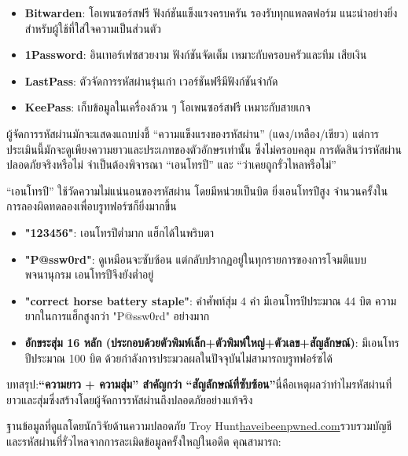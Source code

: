 
\begin{itemize}
  \item \textbf{Bitwarden}: โอเพนซอร์สฟรี ฟังก์ชันแข็งแรงครบครัน รองรับทุกแพลตฟอร์ม แนะนำอย่างยิ่งสำหรับผู้ใช้ที่ใส่ใจความเป็นส่วนตัว
  \item \textbf{1Password}: อินเทอร์เฟซสวยงาม ฟังก์ชันจัดเต็ม เหมาะกับครอบครัวและทีม เสียเงิน
  \item \textbf{LastPass}: ตัวจัดการรหัสผ่านรุ่นเก่า เวอร์ชันฟรีมีฟังก์ชันจำกัด
  \item \textbf{KeePass}: เก็บข้อมูลในเครื่องล้วน ๆ โอเพนซอร์สฟรี เหมาะกับสายเกจ
\end{itemize}


ผู้จัดการรหัสผ่านมักจะแสดงแถบบ่งชี้ “ความแข็งแรงของรหัสผ่าน” (แดง/เหลือง/เขียว) แต่การประเมินนี้มักจะดูเพียงความยาวและประเภทของตัวอักษรเท่านั้น ซึ่งไม่ครอบคลุม การตัดสินว่ารหัสผ่านปลอดภัยจริงหรือไม่ จำเป็นต้องพิจารณา “เอนโทรปี” และ “ว่าเคยถูกรั่วไหลหรือไม่”


“เอนโทรปี” ใช้วัดความไม่แน่นอนของรหัสผ่าน โดยมีหน่วยเป็นบิต ยิ่งเอนโทรปีสูง จำนวนครั้งในการลองผิดทดลองเพื่อบรูทฟอร์ซก็ยิ่งมากขึ้น

\begin{itemize}
  \item \textbf{"123456"}: เอนโทรปีต่ำมาก แฮ็กได้ในพริบตา
  \item \textbf{"P@ssw0rd"}: ดูเหมือนจะซับซ้อน แต่กลับปรากฏอยู่ในทุกรายการของการโจมตีแบบพจนานุกรม เอนโทรปีจึงยังต่ำอยู่
  \item \textbf{"correct horse battery staple"}: คำศัพท์สุ่ม 4 คำ มีเอนโทรปีประมาณ 44 บิต ความยากในการแฮ็กสูงกว่า "P@ssw0rd" อย่างมาก
  \item \textbf{อักขระสุ่ม 16 หลัก (ประกอบด้วยตัวพิมพ์เล็ก+ตัวพิมพ์ใหญ่+ตัวเลข+สัญลักษณ์)}: มีเอนโทรปีประมาณ 100 บิต ด้วยกำลังการประมวลผลในปัจจุบันไม่สามารถบรูทฟอร์ซได้
\end{itemize}

บทสรุป:\textbf{“ความยาว + ความสุ่ม” สำคัญกว่า “สัญลักษณ์ที่ซับซ้อน”}นี่คือเหตุผลว่าทำไมรหัสผ่านที่ยาวและสุ่มซึ่งสร้างโดยผู้จัดการรหัสผ่านถึงปลอดภัยอย่างแท้จริง


ฐานข้อมูลที่ดูแลโดยนักวิจัยด้านความปลอดภัย Troy Hunt\href{https://haveibeenpwned.com}{haveibeenpwned.com}รวบรวมบัญชีและรหัสผ่านที่รั่วไหลจากการละเมิดข้อมูลครั้งใหญ่ในอดีต คุณสามารถ:

